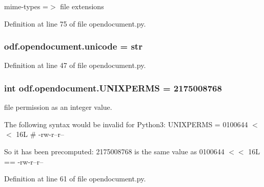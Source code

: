 mime-\/types =$>$ file extensions 



Definition at line 75 of file opendocument.\+py.

\hypertarget{namespaceodf_1_1opendocument_a35331d671c8f271f0722c22d783ad205}{
\subsubsection[{unicode}]{\setlength{\rightskip}{0pt plus 5cm}odf.\+opendocument.\+unicode = str}}\label{namespaceodf_1_1opendocument_a35331d671c8f271f0722c22d783ad205}


Definition at line 47 of file opendocument.\+py.

\hypertarget{namespaceodf_1_1opendocument_a8302c421f86687ff0d9f2aca113fd769}{
\subsubsection[{U\+N\+I\+X\+P\+E\+R\+M\+S}]{\setlength{\rightskip}{0pt plus 5cm}int odf.\+opendocument.\+U\+N\+I\+X\+P\+E\+R\+M\+S = 2175008768}}\label{namespaceodf_1_1opendocument_a8302c421f86687ff0d9f2aca113fd769}


file permission as an integer value. 

The following syntax would be invalid for Python3\+: U\+N\+I\+X\+P\+E\+R\+M\+S = 0100644 $<$$<$ 16\+L \# -\/rw-\/r--r--

So it has been precomputed\+: 2175008768 is the same value as 0100644 $<$$<$ 16\+L == -\/rw-\/r--r-- 

Definition at line 61 of file opendocument.\+py.

